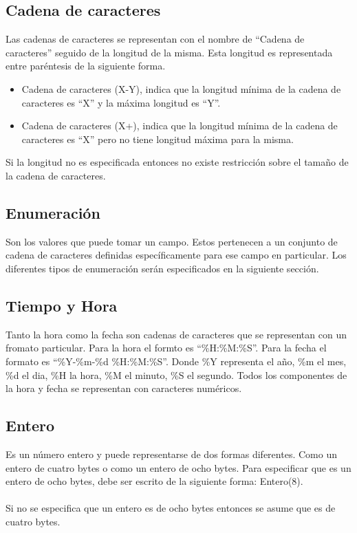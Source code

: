 \subsection{Cadena de caracteres}
Las cadenas de caracteres se representan con el nombre de ``Cadena de caracteres'' seguido de la longitud de la misma. Esta longitud es representada entre paréntesis de la siguiente forma.
\begin{itemize}
\item Cadena de caracteres (X-Y), indica que la longitud mínima de la cadena de caracteres es ``X'' y la máxima longitud es ``Y''.
\item Cadena de caracteres (X+), indica que la longitud mínima de la cadena de caracteres es ``X'' pero no tiene longitud máxima para la misma.
\end{itemize}
Si la longitud no es especificada entonces no existe restricción sobre el tamaño de la cadena de caracteres.

\subsection{Enumeración}
Son los valores que puede tomar un campo. Estos pertenecen a un conjunto de cadena de caracteres definidas específicamente para ese campo en particular. Los diferentes tipos de enumeración serán especificados en la siguiente sección.

\subsection{Tiempo y Hora}
Tanto la hora como la fecha son cadenas de caracteres que se representan con un fromato particular. Para la hora el formto es ``\%H:\%M:\%S''. Para la fecha el formato es ``\%Y-\%m-\%d \%H:\%M:\%S''. Donde \%Y representa el año, \%m el mes, \%d el dia, \%H la hora, \%M el minuto, \%S el segundo. Todos los componentes de la hora y fecha se representan con caracteres numéricos.

\subsection{Entero}
Es un número entero y puede representarse de dos formas diferentes. Como un entero de cuatro bytes o como un entero de ocho bytes. Para especificar que es un entero de ocho bytes, debe ser escrito de la siguiente forma: Entero(8).
\\
\\
Si no se especifica que un entero es de ocho bytes entonces se asume que es de cuatro  bytes.

